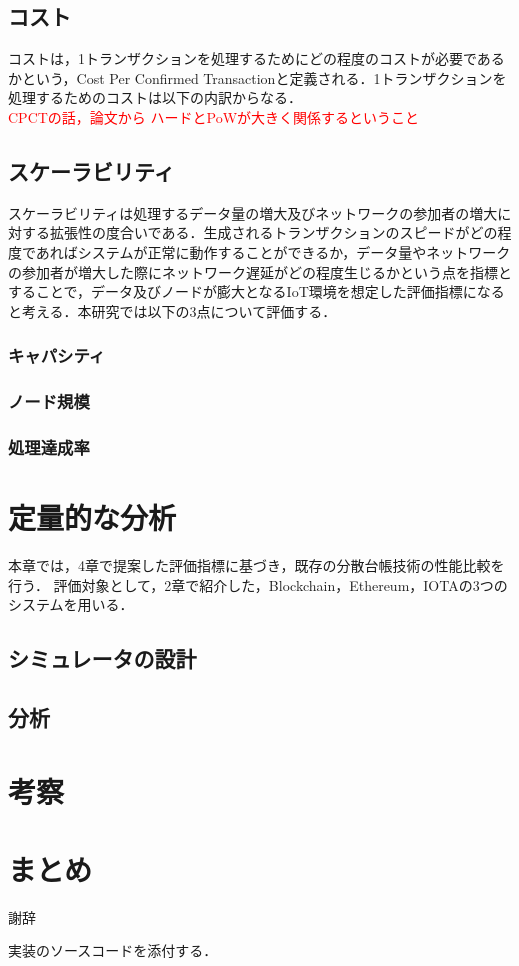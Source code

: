 \documentclass{kuisthesis}			%
\begin{document}
\subsection{コスト}
コストは，1トランザクションを処理するためにどの程度のコストが必要であるかという，Cost Per Confirmed Transactionと定義される．1トランザクションを処理するためのコストは以下の内訳からなる．\\
\textcolor{red}{CPCTの話，論文から ハードとPoWが大きく関係するということ}

\subsection{スケーラビリティ}
スケーラビリティは処理するデータ量の増大及びネットワークの参加者の増大に対する拡張性の度合いである．生成されるトランザクションのスピードがどの程度であればシステムが正常に動作することができるか，データ量やネットワークの参加者が増大した際にネットワーク遅延がどの程度生じるかという点を指標とすることで，データ及びノードが膨大となるIoT環境を想定した評価指標になると考える．本研究では以下の3点について評価する．
\subsubsection{キャパシティ}
\subsubsection{ノード規模}
\subsubsection{処理達成率}

\section{定量的な分析}
本章では，4章で提案した評価指標に基づき，既存の分散台帳技術の性能比較を行う．
評価対象として，2章で紹介した，Blockchain，Ethereum，IOTAの3つのシステムを用いる．
\subsection{シミュレータの設計}

\subsection{分析}


\section{考察}


\section{まとめ}


\acknowledgments
謝辞




\Appendix[付録]
実装のソースコードを添付する．
\end{document}
